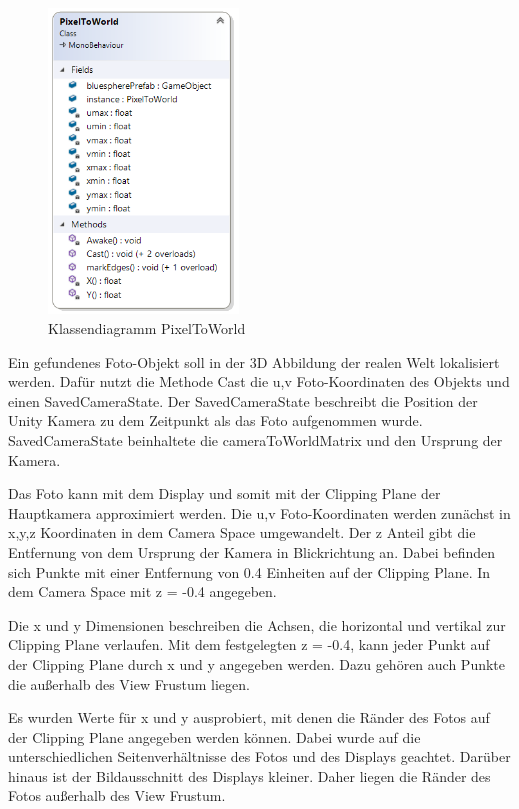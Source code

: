 \begin{figure}[H]
	\centering
	\includegraphics[width=0.45\textwidth]{images/dia_pixeltoworld.PNG}
	\caption[]{Klassendiagramm PixelToWorld}
	\label{dia:pixeltoworld}
\end{figure}

Ein gefundenes Foto-Objekt soll in der 3D Abbildung der realen Welt lokalisiert werden. Dafür nutzt die Methode Cast die u,v Foto-Koordinaten des Objekts und einen SavedCameraState. Der SavedCameraState beschreibt die Position der Unity Kamera zu dem Zeitpunkt als das Foto aufgenommen wurde. SavedCameraState beinhaltete die cameraToWorldMatrix und den Ursprung der Kamera.

Das Foto kann mit dem Display und somit mit der Clipping Plane der Hauptkamera approximiert werden.
Die u,v Foto-Koordinaten werden zunächst in x,y,z Koordinaten in dem Camera Space umgewandelt. Der z Anteil gibt die Entfernung von dem Ursprung der Kamera in Blickrichtung an. Dabei befinden sich Punkte mit einer Entfernung von 0.4 Einheiten auf der Clipping Plane. In dem Camera Space mit z = -0.4 angegeben. 

Die x und y Dimensionen beschreiben die Achsen, die horizontal und vertikal zur Clipping Plane verlaufen. Mit dem festgelegten z = -0.4, kann jeder Punkt auf der Clipping Plane durch x und y angegeben werden. Dazu gehören auch Punkte die außerhalb des View Frustum liegen.

Es wurden Werte für x und y ausprobiert, mit denen die Ränder des Fotos auf der Clipping Plane angegeben werden können. Dabei wurde auf die unterschiedlichen Seitenverhältnisse des Fotos und des Displays geachtet. Darüber hinaus ist der Bildausschnitt des Displays kleiner. Daher liegen die Ränder des Fotos außerhalb des View Frustum. 

